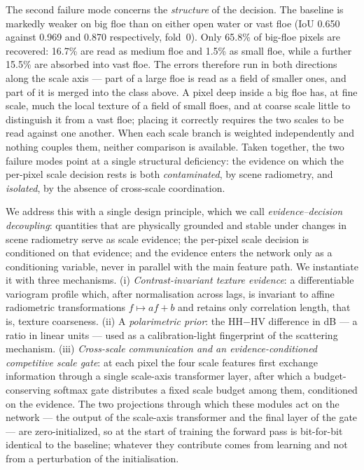 \documentclass[preprint,12pt,authoryear]{elsarticle}
\begin{document}
The second failure mode concerns the \emph{structure} of the decision. The
baseline is markedly weaker on big floe than on either open water or vast floe
(IoU 0.650 against 0.969 and 0.870 respectively, fold~0). Only 65.8\% of
big-floe pixels are recovered: 16.7\% are read as medium floe and 1.5\% as small
floe, while a further 15.5\% are absorbed into vast floe. The errors therefore
run in both directions along the scale axis --- part of a large floe is read as a
field of smaller ones, and part of it is merged into the class above. A pixel
deep inside a big floe has, at fine scale, much the local texture of a field of
small floes, and at coarse scale little to distinguish it from a vast floe;
placing it correctly requires the two scales to be read against one another.
When each scale branch is weighted independently and nothing couples them,
neither comparison is available. Taken together, the two failure modes
point at a single structural deficiency: the evidence on which the per-pixel
scale decision rests is both \emph{contaminated}, by scene radiometry, and
\emph{isolated}, by the absence of cross-scale coordination.

We address this with a single design principle, which we call
\emph{evidence--decision decoupling}: quantities that are physically grounded
and stable under changes in scene radiometry serve as scale evidence; the
per-pixel scale decision is conditioned on that evidence; and the evidence
enters the network only as a conditioning variable, never in parallel with the
main feature path. We instantiate it with three mechanisms. (i)
\emph{Contrast-invariant texture evidence}: a differentiable variogram profile
which, after normalisation across lags, is invariant to affine radiometric
transformations $f \mapsto af+b$ and retains only correlation length, that is,
texture coarseness. (ii) A \emph{polarimetric prior}: the HH$-$HV difference in
dB --- a ratio in linear units --- used as a calibration-light fingerprint of
the scattering mechanism. (iii) \emph{Cross-scale communication and an
evidence-conditioned competitive scale gate}: at each pixel the four scale
features first exchange information through a single scale-axis transformer
layer, after which a budget-conserving softmax gate distributes a fixed scale
budget among them, conditioned on the evidence. The two projections through
which these modules act on the network --- the output of the scale-axis
transformer and the final layer of the gate --- are zero-initialized, so at the
start of training the forward pass is bit-for-bit identical to the baseline; whatever they contribute comes from learning and not
from a perturbation of the initialisation.
\end{document}
